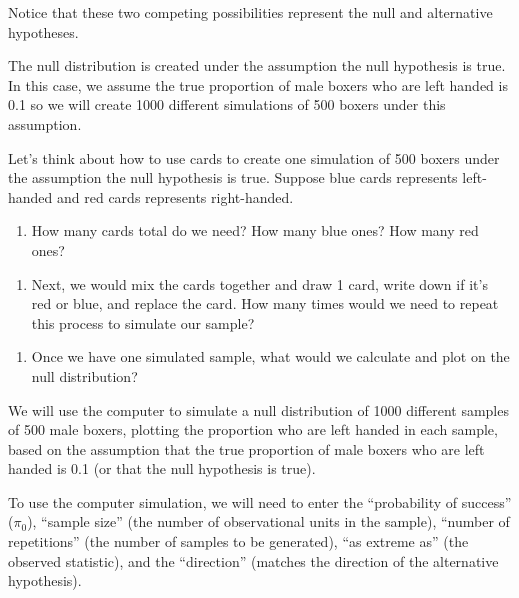 \documentclass[
]{report}
\providecommand{\tightlist}{%
  \setlength{\itemsep}{0pt}\setlength{\parskip}{0pt}}
\begin{document}
Notice that these two competing possibilities represent the null and alternative hypotheses.

The null distribution is created under the assumption the null hypothesis is true. In this case, we assume the true proportion of male boxers who are left handed is 0.1 so we will create 1000 different simulations of 500 boxers under this assumption.

Let's think about how to use cards to create one simulation of 500 boxers under the assumption the null hypothesis is true. Suppose blue cards represents left-handed and red cards represents right-handed.

\begin{enumerate}
\def\labelenumi{\arabic{enumi}.}
\setcounter{enumi}{14}
\tightlist
\item
  How many cards total do we need? How many blue ones? How many red ones?
\end{enumerate}

\vspace{0.5in}

\begin{enumerate}
\def\labelenumi{\arabic{enumi}.}
\setcounter{enumi}{15}
\tightlist
\item
  Next, we would mix the cards together and draw 1 card, write down if it's red or blue, and replace the card. How many times would we need to repeat this process to simulate our sample?
\end{enumerate}

\vspace{0.5in}

\begin{enumerate}
\def\labelenumi{\arabic{enumi}.}
\setcounter{enumi}{16}
\tightlist
\item
  Once we have one simulated sample, what would we calculate and plot on the null distribution?
  \vspace{1in}
\end{enumerate}

We will use the computer to simulate a null distribution of 1000 different samples of 500 male boxers, plotting the proportion who are left handed in each sample, based on the assumption that the true proportion of male boxers who are left handed is 0.1 (or that the null hypothesis is true).

To use the computer simulation, we will need to enter the ``probability of success'' (\(\pi_0\)), ``sample size'' (the number of observational units in the sample), ``number of repetitions'' (the number of samples to be generated), ``as extreme as'' (the observed statistic), and the ``direction'' (matches the direction of the alternative hypothesis).
\end{document}
